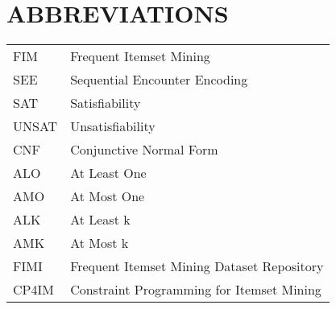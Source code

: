 
\chapter*{ABBREVIATIONS}

\begin{table}[htbp]
    \raggedright
    \begin{tabular}{ll}
        \\
        FIM   & Frequent Itemset Mining                    \\
        SEE   & Sequential Encounter Encoding              \\
        SAT   & Satisfiability                             \\
        UNSAT & Unsatisfiability                           \\
        CNF   & Conjunctive Normal Form                    \\
        ALO   & At Least One                               \\
        AMO   & At Most One                                \\
        ALK   & At Least k                                 \\
        AMK   & At Most k                                  \\
        FIMI  & Frequent Itemset Mining Dataset Repository \\
        CP4IM & Constraint Programming for Itemset Mining  \\
    \end{tabular}
\end{table}